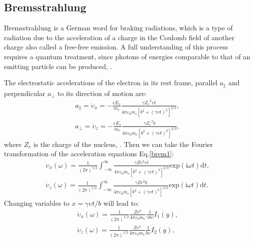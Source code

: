 \documentclass[oneside,a4paper,11pt]{report}
\begin{document}
\subsection{Bremsstrahlung}
Bremsstrahlung is a German word for braking radiations, which is a type of radiation due to the acceleration 
of a charge in the Coulomb field of another charge also called a free-free emission. A full 
understanding of this process requires a quantum treatment, since photons of energies comparable 
to that of an emitting particle can be produced, \citet{rybicki:1}.

The electrostatic accelerations of the electron in its rest frame, parallel $a_{\parallel}$ and perpendicular 
$a_\perp$ to its direction of motion are:        
\begin{equation}
\label{brem1}
\begin{split}
a_{\parallel} = \dot{\upsilon}_x = -\frac{eE_x}{m_e}\frac{\gamma {Z_e}^2 \upsilon t}{4\pi \varepsilon_0 m_e \left [ b^2 + \left ( \gamma \upsilon t \right )^2  \right ]^{2/3}} , \\ 
a_\perp  = \dot{\upsilon}_z = -\frac{eE_z}{m_e}\frac{\gamma {Z_e}^2 b}{4\pi \varepsilon_0 m_e \left [ b^2 + \left ( \gamma \upsilon t \right )^2  \right ]^{2/3}} ,
\end{split}
\end{equation}
where $Z_e$ is the charge of the nucleus, \citet{longair:1}. 
Then we can take the Fourier transformation of the acceleration equations Eq.\eqref{brem1}:
\begin{equation}
 \label{brem2}
\begin{split}
\dot{\upsilon}_x(\omega) = \frac{1}{(2\pi)^{1/2}}\int_{-\infty }^{\infty} \frac{\gamma Ze^2 \upsilon t}{4\pi \varepsilon_0 m_e \left [ b^2 + \left ( \gamma \upsilon t \right )^2 \right ]^{2/3} } \mathrm{exp}\left ( \mathrm{i} \omega t \right )\mathrm{d} t, \\
\dot{\upsilon}_z(\omega) = \frac{1}{(2\pi)^{1/2}}\int_{-\infty }^{\infty} \frac{\gamma Ze^2b}{4\pi \varepsilon_0 m_e \left [ b^2 + \left ( \gamma \upsilon t \right )^2 \right ]^{2/3} } \mathrm{exp}\left ( \mathrm{i} \omega t \right )\mathrm{d} t.
\end{split}
\end{equation}
Changing variables to $x = \gamma \upsilon t / b$ will lead to:
\begin{equation}
 \label{brem3}
\begin{split}
\dot{\upsilon}_x(\omega) = \frac{1}{(2\pi)^{1/2}} \frac{Ze^2}{4 \pi \varepsilon_0 m_e} \frac{1}{\gamma b \upsilon} I_1(y), \\
\dot{\upsilon}_z(\omega) = \frac{1}{(2\pi)^{1/2}} \frac{Ze^2}{4 \pi \varepsilon_0 m_e} \frac{1}{b \upsilon} I_2(y),
\end{split}
\end{equation}
\end{document}
